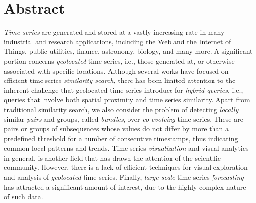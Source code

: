 
\chapter{Abstract} \label{chap:abstract}

\textit{Time series} are generated and stored at a vastly increasing rate in many industrial and research applications, including the Web and the Internet of Things, public utilities, finance, astronomy, biology, and many more. A significant portion concerns \textit{geolocated} time series, i.e., those generated at, or otherwise associated with specific locations. Although several works have focused on efficient time series \textit{similarity search}, there has been limited attention to the inherent challenge that geolocated time series introduce for \textit{hybrid queries}, i.e., queries that involve both spatial proximity and time series similarity. Apart from traditional similarity search, we also consider the problem of detecting \textit{locally} similar \textit{pairs} and groups, called \textit{bundles}, over \textit{co-evolving} time series. These are pairs or groups of subsequences whose values do not differ by more than a predefined threshold for a number of consecutive timestamps, thus indicating common local patterns and trends. Time series \textit{visualization} and visual analytics in general, is another field that has drawn the attention of the scientific community. However, there is a lack of efficient techniques for visual exploration and analysis of \textit{geolocated} time series. Finally, \textit{large-scale} time series \textit{forecasting} has attracted a significant amount of interest, due to the highly complex nature of such data.

